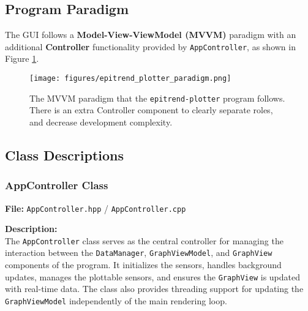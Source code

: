 \documentclass{article}
\begin{document}
\newpage

\subsection{Program Paradigm}
The GUI follows a \textbf{Model-View-ViewModel (MVVM)} paradigm with an additional \textbf{Controller} functionality provided by \texttt{AppController}, as shown in Figure \ref{fig:epitrend_plotter_paradigm}.

\begin{figure} [h]
    \centering
    \texttt{[image: figures/epitrend\_plotter\_paradigm.png]}
    \caption{\label{fig:epitrend_plotter_paradigm} The MVVM paradigm that the \texttt{epitrend-plotter} program follows. There is an extra Controller component to clearly separate roles, and decrease development complexity.}
\end{figure}

\subsection{Class Descriptions}
\subsubsection{AppController Class}
\textbf{File:} \texttt{AppController.hpp} / \texttt{AppController.cpp} 

\vspace{5pt}
\noindent
\textbf{Description:}
\\
\noindent
The \texttt{AppController} class serves as the central controller for managing the interaction between the \texttt{DataManager}, \texttt{GraphViewModel}, and \texttt{GraphView} components of the program. It initializes the sensors, handles background updates, manages the plottable sensors, and ensures the \texttt{GraphView} is updated with real-time data. The class also provides threading support for updating the \texttt{GraphViewModel} independently of the main rendering loop.
\end{document}
